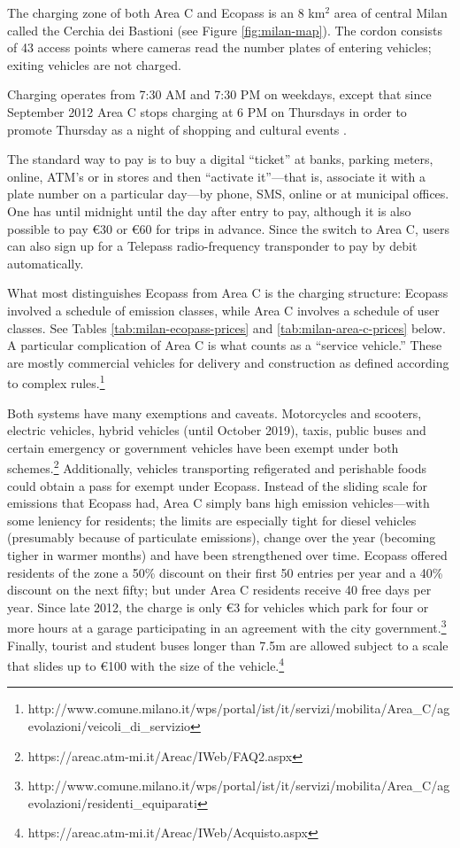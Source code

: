 The charging zone of both Area C and Ecopass is an 8 km$^{2}$ area of central Milan called the Cerchia dei Bastioni (see Figure \ref{fig:milan-map}). The cordon consists of 43 access points where cameras read the number plates of entering vehicles; exiting vehicles are not charged. 

Charging operates from 7:30 AM and 7:30 PM on weekdays, except that since September 2012 Area C stops charging at 6 PM on Thursdays in order to promote Thursday as a night of shopping and cultural events \citep{CorriereDellaSera2012}. 

The standard way to pay is to buy a digital ``ticket'' at banks, parking meters, online, ATM's or in stores and then ``activate it''---that is, associate it with a plate number on a particular day---by phone, SMS, online or at municipal offices. One has until midnight until the day after entry to pay, although it is also possible to pay \euro 30 or \euro 60 for trips in advance. Since the switch to Area C, users can also sign up for a Telepass radio-frequency transponder to pay by debit automatically. 

What most distinguishes Ecopass from Area C is the charging structure: Ecopass involved a schedule of emission classes, while Area C involves a schedule of user classes. See Tables \ref{tab:milan-ecopass-prices} and \ref{tab:milan-area-c-prices} below. A particular complication of Area C is what counts as a ``service vehicle.'' These are mostly commercial vehicles for delivery and construction as defined according to complex rules.\footnote{http://www.comune.milano.it/wps/portal/ist/it/servizi/mobilita/Area\_C/agevolazioni/veicoli\_di\_servizio} 

Both systems have many exemptions and caveats. Motorcycles and scooters, electric vehicles, hybrid vehicles (until October 2019), taxis, public buses and certain emergency or government vehicles have been exempt under both schemes.\footnote{https://areac.atm-mi.it/Areac/IWeb/FAQ2.aspx} Additionally, vehicles transporting refigerated and perishable foods could obtain a pass for  exempt under Ecopass. Instead of the sliding scale for emissions that Ecopass had, Area C simply bans high emission vehicles---with some leniency for residents; the limits are especially tight for diesel vehicles (presumably because of particulate emissions), change over the year (becoming tigher in warmer months) and have been strengthened over time. Ecopass offered residents of the zone a 50\% discount on their first 50 entries per year and a 40\% discount on the next fifty; but under Area C residents receive 40 free days per year. Since late 2012, the charge is only \euro3 for vehicles which park for four or more hours at a garage participating in an agreement with the city government.\footnote{http://www.comune.milano.it/wps/portal/ist/it/servizi/mobilita/Area\_C/agevolazioni/residenti\_equiparati} Finally, tourist and student buses longer than 7.5m are allowed subject to a scale that slides up to \euro 100 with the size of the vehicle.\footnote{https://areac.atm-mi.it/Areac/IWeb/Acquisto.aspx}

